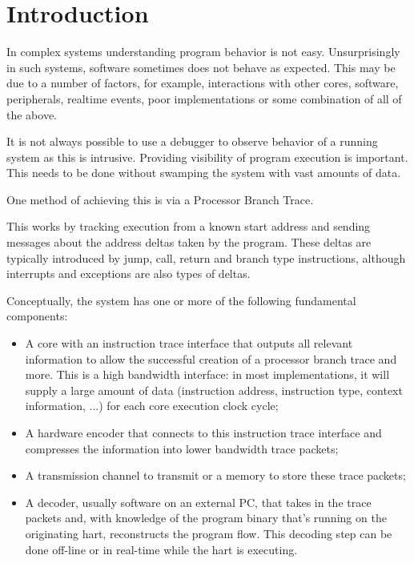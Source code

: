 \chapter{Introduction}
\label{sec:intro}

In complex systems understanding program behavior is not easy.
Unsurprisingly in such systems, software sometimes does not behave as
expected. This may be due to a number of factors, for example,
interactions with other cores, software, peripherals, realtime
events, poor implementations or some combination of all of the above.


It is not always possible to use a debugger to observe behavior of a
running system as this is intrusive.  Providing visibility of program
execution is important.  This needs to be done without swamping the
system with vast amounts of data.

One method of achieving this is via a Processor Branch Trace.

This works by tracking execution from a known start address and sending
messages about the address deltas taken by the program. These deltas are
typically introduced by jump, call, return and branch type instructions,
although interrupts and exceptions are also types of deltas.

Conceptually, the system has one or more of the following fundamental components:

\begin{itemize}
  \item
    A core with an instruction trace interface that outputs all relevant
    information to allow the successful creation of a processor branch trace and more.
    This is a high bandwidth interface: in most implementations, it will supply
    a large amount of data (instruction address, instruction type, context information, ...)
    for each core execution clock cycle;
  \item
    A hardware encoder that connects to this instruction trace interface and compresses
    the information into lower bandwidth trace packets;
  \item
    A transmission channel to transmit or a memory to store these trace packets;
  \item
    A decoder, usually software on an external PC, that takes in the trace
    packets and, with knowledge of the program binary that's running on the
    originating hart, reconstructs the program flow. This decoding step can
    be done off-line or in real-time while the hart is executing.
\end{itemize}

